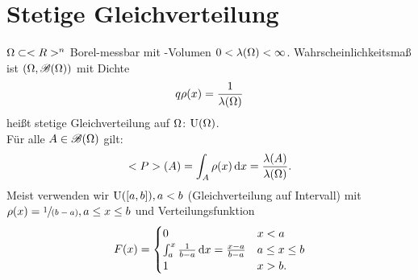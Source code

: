 \section{Stetige Gleichverteilung}

\begin{*erinnerung}
	$\Omega \subset <R>^n$ Borel-messbar mit -Volumen $0 < \lambda(\Omega) < \infty$. Wahrscheinlichkeitsmaß ist $(\Omega, \mathscr{B}(\Omega))$ mit Dichte
	\begin{align*}
	q\rho(x) = \frac{1}{\lambda(\Omega)}
	\end{align*}
	heißt stetige Gleichverteilung auf $\Omega$: $\operatorname{U}(\Omega)$.\\
	Für alle $A \in \mathscr{B}(\Omega)$ gilt:
	\begin{align*}
		<P>(A) = \int_{A} \rho(x) \,\mathrm{d} x = \frac{\lambda(A)}{\lambda(\Omega)}.
	\end{align*}
	Meist verwenden wir $\operatorname{U}([a,b]), a < b$ (Gleichverteilung auf Intervall) mit $\rho(x) = \sfrac{1}{(b-a)}, a \le x \le b$ und Verteilungsfunktion
	\begin{align*}
		F(x) = 
		\begin{cases}
			0 & x < a\\
			\int_{a}^{x} \frac{1}{b-a} \,\mathrm{d} x = \frac{x-a}{b-a} & a \le x \le b\\
			1 & x >b.
		\end{cases}
	\end{align*}
\end{*erinnerung}